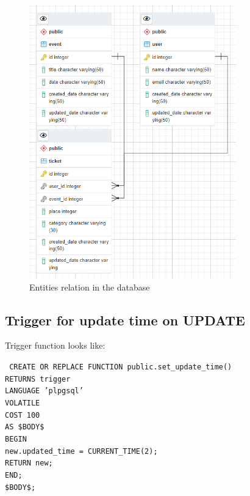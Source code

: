 \begin{figure}[h]
    \centering
    \includegraphics[width=0.8\textwidth]{images/database_relations}
    \caption{Entities relation in the database}
    \label{fig:db_relations}
\end{figure}

\subsection{Trigger for update time on UPDATE}\label{subsec:trigger-update-time}

Trigger function looks like:

\texttt{
    CREATE OR REPLACE FUNCTION public.set\_update\_time() \\
    RETURNS trigger \\
    LANGUAGE 'plpgsql' \\
    VOLATILE \\
    COST 100 \\
    AS \$BODY\$ \\
    BEGIN \\
    new.updated\_time = CURRENT\_TIME(2); \\
    RETURN new; \\
    END; \\
    \$BODY\$; \\
}

